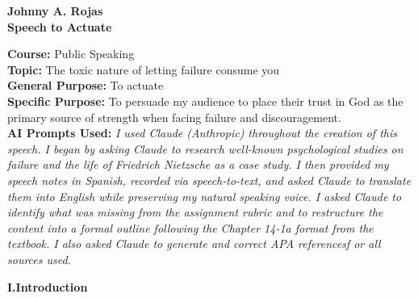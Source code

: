 \documentclass[12pt]{article}
\begin{document}
\begin{center}
  \textbf{Johnny A. Rojas}\\[2pt]
  \textbf{Speech to Actuate}
\end{center}

\noindent\textbf{Course:} Public Speaking\\
\noindent\textbf{Topic:} The toxic nature of letting failure consume you\\
\noindent\textbf{General Purpose:} To actuate\\
\noindent\textbf{Specific Purpose:} To persuade my audience to place their trust in God as the primary source of strength when facing failure and discouragement.\\
\noindent\textbf{AI Prompts Used:} \textit{I used Claude (Anthropic) throughout the creation of this speech. I began by asking Claude to research well-known psychological studies on failure and the life of Friedrich Nietzsche as a case study. I then provided my speech notes in Spanish, recorded via speech-to-text, and asked Claude to translate them into English while preserving my natural speaking voice. I asked Claude to identify what was missing from the assignment rubric and to restructure the content into a formal outline following the Chapter 14-1a format from the textbook. I also asked Claude to generate and correct APA referencesf or all sources used.}

\bigskip

\noindent\textbf{I.\quad Introduction}
\end{document}
